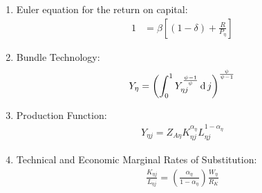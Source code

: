 \documentclass[../thesis.tex]{subfiles}
\begin{document}
\begin{enumerate}
	\item Euler equation for the return on capital:
	\begin{align}
		1 &= \beta \left[ (1 - \delta) + \frac{R}{P_{\eta}} \right] \label{ext-mod:reg-ss-capital-euler-equation}
	\end{align}
	
	\begin{comment}
			\item Region 1 Euler equation for the bonds return:
		\begin{align}
			\frac{\mathbb{E}_{t} \left\{Q_{1} C_{1}^{\sigma} \right\}}{Q_{1} C_{1}^{\sigma}} &= \beta (1 + R_{}) \implies \nonumber \\
			1 &= \beta (1 + R_{}) \label{ext-mod:reg-ss-bonds-euler-equation}
		\end{align}
		
		\item Euler equation for regional consumption:
		\begin{align}
			\frac{\mathbb{E}_{t} \left\{ Q_{1} C_{1}^{\sigma} \right\}}{Q_{1} C_{1}^{\sigma}} &= \frac{\mathbb{E}_{t} \left\{ Q_{2} C_{2}^{\sigma} \right\}}{Q_{2} C_{2}^{\sigma}} = 1 \label{ext-mod:reg-ss-bonds-euler-equation-2}
		\end{align}
	\end{comment}
	
	\item Bundle Technology:
	\begin{align}
		Y_{\eta} = \left( \int_{0}^{1} Y_{\eta j}^{\frac{\psi-1}{\psi}} \operatorname{d} j \right)^{\frac{\psi}{\psi-1}} \label{ext-mod:reg-ss-final-goods-firm-bundle-rule}
	\end{align}

	\item Production Function:
	\begin{align}
		Y_{\eta j} = Z_{A\eta} K_{\eta j}^{\alpha_{\eta}} L_{\eta j}^{1-{\alpha_{\eta}}} 
		\label{ext-mod:reg-ss-int-good-firm-prod-function}
	\end{align}
	
	\item Technical and Economic Marginal Rates of Substitution:
	\begin{align}
		\frac{K_{\eta j}}{L_{\eta j}} = \left( \frac{{\alpha_{\eta}}}{1-\alpha_{\eta}} \right) \frac{W_{\eta}}{R_{K}} \label{ext-mod:reg-ss-int-good-firm-TMRS}
	\end{align}
	
	\begin{comment}
		

\end{comment}
\end{enumerate}
\end{document}
